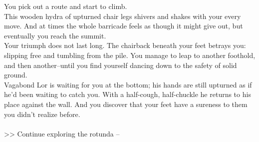 You pick out a route and start to climb.\\

This wooden hydra of upturned chair legs shivers and shakes with your every move. And at times the whole barricade feels as though it might give out, but eventually you reach the summit.\\

Your triumph does not last long. The chairback beneath your feet betrays you: slipping free and tumbling from the pile. You manage to leap to another foothold, and then another--until you find yourself dancing down to the safety of solid ground.\\

Vagabond Lor is waiting for you at the bottom; his hands are still upturned as if he'd been waiting to catch you. With a half-cough, half-chuckle he returns to his place against the wall. And you discover that your feet have a sureness to them you didn't realize before.\\
\\

>> Continue exploring the rotunda -- 